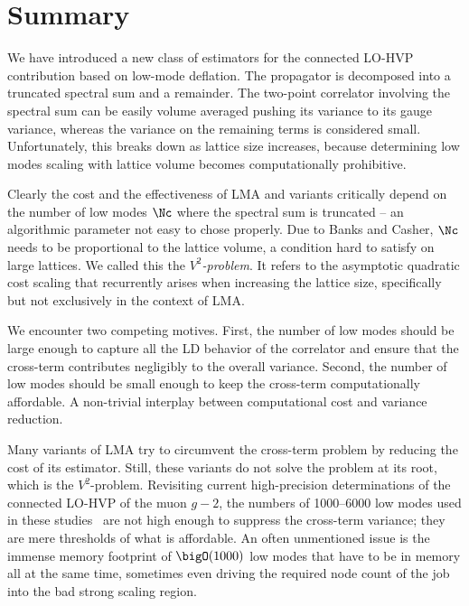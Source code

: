 \section{Summary}
\label{sec:lma:summary}

We have introduced a new class of estimators for the connected LO-HVP contribution based on low-mode deflation.
The propagator is decomposed into a truncated spectral sum and a remainder.
The two-point correlator involving the spectral sum can be easily volume averaged pushing its variance to its gauge variance, whereas the variance on the remaining terms is considered small.
Unfortunately, this breaks down as lattice size increases, because determining low modes scaling with lattice volume becomes computationally prohibitive.

Clearly the cost and the effectiveness of LMA and variants critically depend on the number of low modes $\Nc$ where the spectral sum is truncated -- an algorithmic parameter not easy to chose properly.
Due to Banks and Casher\cite{banks1980}, $\Nc$ needs to be proportional to the lattice volume, a condition hard to satisfy on large lattices.
We called this the \emph{$V^{2}$-problem}.
It refers to the asymptotic quadratic cost scaling that recurrently arises when increasing the lattice size, specifically but not exclusively in the context of LMA.

We encounter two competing motives.
First, the number of low modes should be large enough to capture all the LD behavior of the correlator and ensure that the cross-term contributes negligibly to the overall variance.
Second, the number of low modes should be small enough to keep the cross-term computationally affordable.
A non-trivial interplay between computational cost and variance reduction.

Many variants of LMA try to circumvent the cross-term problem by reducing the cost of its estimator.
Still, these variants do not solve the problem at its root, which is the $V^2$-problem.
Revisiting current high-precision determinations of the connected LO-HVP of the muon $g-2$, the numbers of \numrange{1000}{6000} low modes used in these studies~\cite{Djukanovic:2024cmq,RBC_2024,bmw_2024,Aubin:2022hgm} are not high enough to suppress the cross-term variance; they are mere thresholds of what is affordable.
An often unmentioned issue is the immense memory footprint of $\bigO(1000)$ low modes that have to be in memory all at the same time, sometimes even driving the required node count of the job into the bad strong scaling region.

